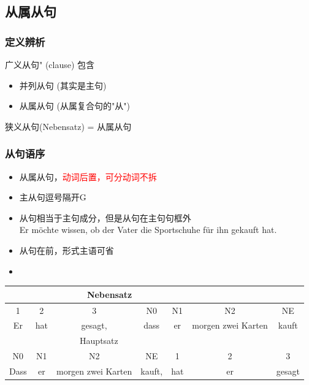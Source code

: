 \subsection{从属从句}

\subsubsection{定义辨析}
广义从句" (clause) 包含
\begin{itemize}
    \item 并列从句 (其实是主句)
    \item 从属从句 (从属复合句的"从")
\end{itemize}
狭义从句(Nebensatz) = 从属从句

\subsubsection{从句语序}

\begin{itemize}
    \item 从属从句，\textcolor{red}{动词后置，可分动词不拆}
    \item 主从句逗号隔开G
    \item 从句相当于主句成分，但是从句在主句句框外 \\
          Er möchte wissen, ob der Vater die Sportschuhe für ihn gekauft hat.
    \item 从句在前，形式主语可省
    \item
\end{itemize}

\begin{center}
    \begin{tabular}{|c|c|c|c|c|c|c|}
        \hline
        \rowcolor{gray}
        \multicolumn{3}{|c|}{Hauptsatz} & \multicolumn{4}{|c|}{Nebensatz}                                                                   \\
        \hline
        1                               & 2                               & 3                  & N0     & N1  & N2                 & NE     \\
        \hline
        Er                              & hat                             & gesagt,            & dass   & er  & morgen zwei Karten & kauft  \\
        \hline
        \rowcolor{gray}
        \multicolumn{4}{|c|}{Nebensatz} & \multicolumn{3}{|c|}{Hauptsatz}                                                                   \\
        \hline
        N0                              & N1                              & N2                 & NE     & 1   & 2                  & 3      \\
        \hline
        Dass                            & er                              & morgen zwei Karten & kauft, & hat & er                 & gesagt \\
        \hline
    \end{tabular}
\end{center}

